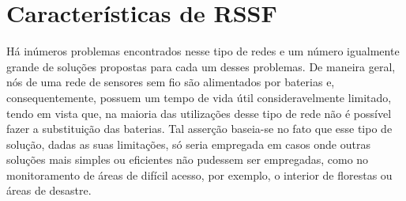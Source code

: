 \section{Características de RSSF} \label{sec:featuresRSSF}

Há inúmeros problemas encontrados nesse tipo de redes e um número igualmente grande de soluções propostas para cada um desses problemas. De maneira geral, nós de uma rede de sensores sem fio são alimentados por baterias e, consequentemente, possuem um tempo de vida útil consideravelmente limitado, tendo em vista que, na maioria das utilizações desse tipo de rede não é possível fazer a substituição das baterias. Tal asserção baseia-se no fato que esse tipo de solução, dadas as suas limitações, só seria empregada em casos onde outras soluções mais simples ou eficientes não pudessem ser empregadas, como no monitoramento de áreas de difícil acesso, por exemplo, o interior de florestas ou áreas de desastre. 

